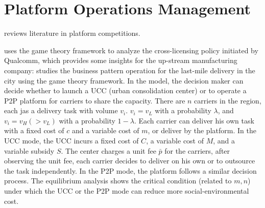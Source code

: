 \documentclass[10pt]{report}
\begin{document}
\clearpage
\section{Platform Operations Management}

\cite{rietveld2021platform} reviews literature in platform competitions.

\cite{wang2023} uses the game theory framework to analyze the cross-licensing policy initiated by Qualcomm, which provides some insights
for the up-stream manufacturing company:
\cite{deng2021urban} studies the business pattern operation for the last-mile delivery in the city using the game theory framework.
In the model, the decision maker can decide whether to launch a UCC (urban consolidation center) or to operate a P2P platform for carriers to share the capacity.
There are $n$ carriers in the region, each jas a delivery task with volume $v_i$. $v_i=v_L$ with a probability $\lambda$, and $v_i=v_H(>v_L)$ with a probability
$1-\lambda$. Each carrier can deliver his own task with a fixed cost of $c$ and a variable cost of $m$, or deliver by the platform.
In the UCC mode, the UCC incurs a fixed cost of $C$, a variable cost of $M$, and a variable subsidy $S$. The center charges a unit fee $\bar{p}$ for the carriers, after observing the unit fee, each carrier
decides to deliver on his own or to outsource the task independently. In the P2P mode, the platform follows a similar decision process.
The equilibrium analysis shows the critical condition (related to $m, n$) under which the UCC or the P2P mode can reduce more social-environmental cost.
\end{document}
